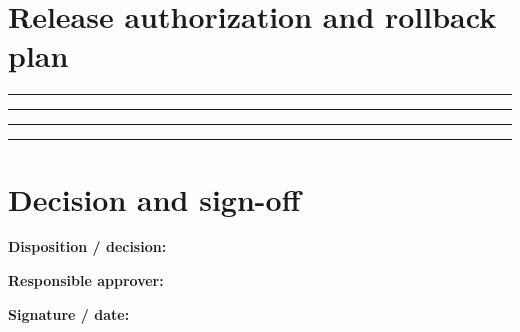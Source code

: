 \documentclass[10pt,letterpaper]{article}
\begin{document}
\section{Release authorization and rollback plan}
\noindent\rule{\linewidth}{0.4pt}\par\vspace{16pt}
\noindent\rule{\linewidth}{0.4pt}\par\vspace{16pt}
\noindent\rule{\linewidth}{0.4pt}\par\vspace{16pt}
\noindent\rule{\linewidth}{0.4pt}\par\vspace{16pt}
\section{Decision and sign-off}
\noindent\textbf{Disposition / decision:}\quad\hrulefill\par\vspace{11pt}
\noindent\textbf{Responsible approver:}\quad\hrulefill\par\vspace{11pt}
\noindent\textbf{Signature / date:}\quad\hrulefill\par\vspace{11pt}
\end{document}
